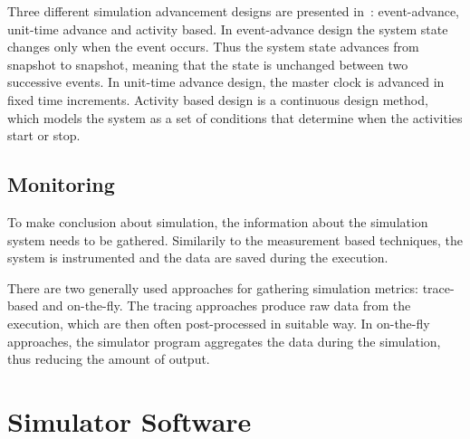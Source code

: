 Three different simulation advancement designs are presented in~\cite{peros:2009:simulation}: event-advance, unit-time advance and activity based. In event-advance design the system state changes only when the event occurs. Thus the system state advances from snapshot to snapshot, meaning that the state is unchanged between two successive events. In unit-time advance design, the master clock is advanced in fixed time increments. Activity based design is a continuous design method, which models the system as a set of conditions that determine when the activities start or stop.~\cite{peros:2009:simulation}

\subsection{Monitoring}

To make conclusion about simulation, the information about the simulation system needs to be gathered. Similarily to the measurement based techniques, the system is instrumented and the data are saved during the execution.

There are two generally used approaches for gathering simulation metrics: trace-based and on-the-fly. The tracing approaches produce raw data from the execution, which are then often post-processed in suitable way. In on-the-fly approaches, the simulator program aggregates the data during the simulation, thus reducing the amount of output.


\section{Simulator Software}




